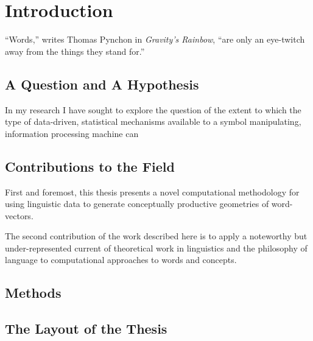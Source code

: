 \chapter{Introduction}
``Words,'' writes Thomas Pynchon in \emph{Gravity's Rainbow}, ``are only an eye-twitch away from the things they stand for.''

\section{A Question and A Hypothesis}
In my research I have sought to explore the question of the extent to which the type of data-driven, statistical mechanisms available to a symbol manipulating, information processing machine can 

\section{Contributions to the Field}
First and foremost, this thesis presents a novel computational methodology for using linguistic data to generate conceptually productive geometries of word-vectors.

The second contribution of the work described here is to apply a noteworthy but under-represented current of theoretical work in linguistics and the philosophy of language to computational approaches to words and concepts.

\section{Methods}

\section{The Layout of the Thesis}
